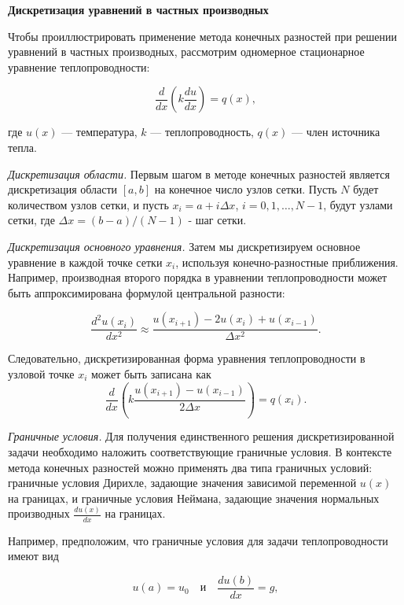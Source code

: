 \textbf{Дискретизация уравнений в частных производных}

Чтобы проиллюстрировать применение метода конечных разностей
при решении уравнений в частных производных, рассмотрим одномерное
стационарное уравнение теплопроводности:

\begin{equation*}
    \frac{d}{dx}\left(k \frac{du}{dx}\right) = q(x),
\end{equation*}

где $u(x)$ — температура, $k$ — теплопроводность,
$q(x)$ — член источника тепла.

\textit{Дискретизация области.}
Первым шагом в методе конечных разностей является
дискретизация области $[a, b]$ на конечное число узлов сетки.
Пусть $N$ будет количеством узлов сетки, и пусть
$x_i = a + i \Delta x$, $i = 0, 1, \ldots, N - 1$, будут узлами сетки,
где $\Delta x = (b - a) / (N - 1)$ - шаг сетки.

\textit{Дискретизация основного уравнения.}
Затем мы дискретизируем основное уравнение в каждой точке сетки $x_i$,
используя конечно-разностные приближения.
Например, производная второго порядка в уравнении теплопроводности
может быть аппроксимирована формулой центральной разности:

\begin{equation*}
    \frac{d^2 u(x_i)}{dx^2} \approx \frac{u(x_{i+1}) - 2u(x_i) + u(x_{i-1})}{\Delta x^2}.
\end{equation*}

Следовательно, дискретизированная форма уравнения теплопроводности
в узловой точке $x_i$ может быть записана как
\begin{equation*}
    \frac{d}{dx}\left(k \frac{u(x_{i+1}) - u(x_{i-1})}{2\Delta x}\right) = q(x_i).
\end{equation*}

\textit{Граничные условия.}
Для получения единственного решения дискретизированной
задачи необходимо наложить соответствующие граничные условия.
В контексте метода конечных разностей можно применять два
типа граничных условий: граничные условия Дирихле,
задающие значения зависимой переменной $u(x)$ на границах,
и граничные условия Неймана, задающие значения нормальных
производных $\frac{du(x)}{dx}$ на границах.

Например, предположим, что граничные условия для
задачи теплопроводности имеют вид

\begin{equation*}
    u(a) = u_0 \quad \text{и} \quad \frac{du(b)}{dx} = g,
\end{equation*}

